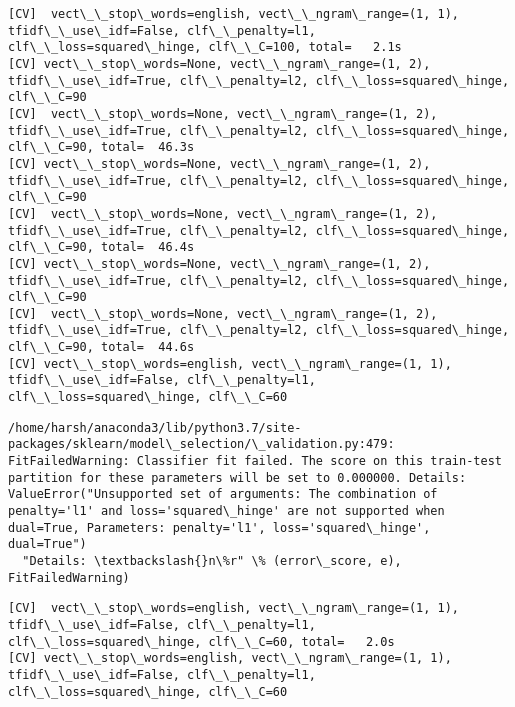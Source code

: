 \documentclass[11pt]{article}
\begin{document}
    \begin{Verbatim}[commandchars=\\\{\}]
[CV]  vect\_\_stop\_words=english, vect\_\_ngram\_range=(1, 1), tfidf\_\_use\_idf=False, clf\_\_penalty=l1, clf\_\_loss=squared\_hinge, clf\_\_C=100, total=   2.1s
[CV] vect\_\_stop\_words=None, vect\_\_ngram\_range=(1, 2), tfidf\_\_use\_idf=True, clf\_\_penalty=l2, clf\_\_loss=squared\_hinge, clf\_\_C=90 
[CV]  vect\_\_stop\_words=None, vect\_\_ngram\_range=(1, 2), tfidf\_\_use\_idf=True, clf\_\_penalty=l2, clf\_\_loss=squared\_hinge, clf\_\_C=90, total=  46.3s
[CV] vect\_\_stop\_words=None, vect\_\_ngram\_range=(1, 2), tfidf\_\_use\_idf=True, clf\_\_penalty=l2, clf\_\_loss=squared\_hinge, clf\_\_C=90 
[CV]  vect\_\_stop\_words=None, vect\_\_ngram\_range=(1, 2), tfidf\_\_use\_idf=True, clf\_\_penalty=l2, clf\_\_loss=squared\_hinge, clf\_\_C=90, total=  46.4s
[CV] vect\_\_stop\_words=None, vect\_\_ngram\_range=(1, 2), tfidf\_\_use\_idf=True, clf\_\_penalty=l2, clf\_\_loss=squared\_hinge, clf\_\_C=90 
[CV]  vect\_\_stop\_words=None, vect\_\_ngram\_range=(1, 2), tfidf\_\_use\_idf=True, clf\_\_penalty=l2, clf\_\_loss=squared\_hinge, clf\_\_C=90, total=  44.6s
[CV] vect\_\_stop\_words=english, vect\_\_ngram\_range=(1, 1), tfidf\_\_use\_idf=False, clf\_\_penalty=l1, clf\_\_loss=squared\_hinge, clf\_\_C=60 

    \end{Verbatim}

    \begin{Verbatim}[commandchars=\\\{\}]
/home/harsh/anaconda3/lib/python3.7/site-packages/sklearn/model\_selection/\_validation.py:479: FitFailedWarning: Classifier fit failed. The score on this train-test partition for these parameters will be set to 0.000000. Details: 
ValueError("Unsupported set of arguments: The combination of penalty='l1' and loss='squared\_hinge' are not supported when dual=True, Parameters: penalty='l1', loss='squared\_hinge', dual=True")
  "Details: \textbackslash{}n\%r" \% (error\_score, e), FitFailedWarning)

    \end{Verbatim}

    \begin{Verbatim}[commandchars=\\\{\}]
[CV]  vect\_\_stop\_words=english, vect\_\_ngram\_range=(1, 1), tfidf\_\_use\_idf=False, clf\_\_penalty=l1, clf\_\_loss=squared\_hinge, clf\_\_C=60, total=   2.0s
[CV] vect\_\_stop\_words=english, vect\_\_ngram\_range=(1, 1), tfidf\_\_use\_idf=False, clf\_\_penalty=l1, clf\_\_loss=squared\_hinge, clf\_\_C=60 

    \end{Verbatim}
\end{document}

